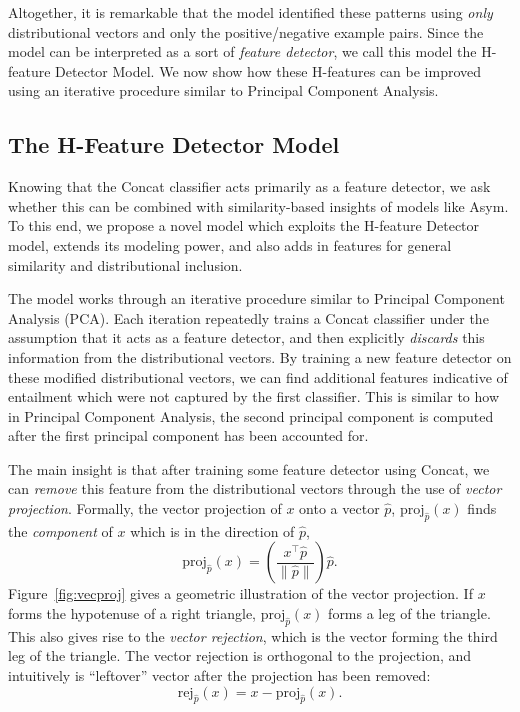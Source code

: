 Altogether, it is remarkable that the model identified these patterns using
{\em only} distributional vectors and only the positive/negative example pairs.
Since the model can be interpreted as a sort of {\em feature detector}, we
call this model the H-feature Detector Model.
We now show how these H-features
can be improved using an iterative procedure similar to Principal Component
Analysis.

\subsection{The H-Feature Detector Model}

Knowing that the Concat classifier acts primarily as a feature detector, we ask
whether this can be combined with similarity-based insights of models like
Asym. To this end, we propose a novel model which exploits the H-feature
Detector model, extends its modeling power, and also adds in features for
general similarity and distributional inclusion.

The model works through an iterative procedure similar to Principal Component
Analysis (PCA). Each iteration repeatedly trains a Concat classifier under the
assumption that it acts as a feature detector, and then explicitly {\em discards}
this information from the distributional vectors. By training a new feature
detector on these modified distributional vectors, we can find additional
features indicative of entailment which were not captured by the first
classifier. This is similar to how in Principal Component Analysis, the
second principal component is computed after the first principal component
has been accounted for.

The main insight is that after training some feature detector using Concat,
we can {\em remove} this feature from the distributional vectors through
the use of {\em vector projection}.
Formally, the vector projection of $x$ onto
a vector $\hat p$, $\text{proj}_{\hat p}(x)$ finds the {\em component} of $x$
which is in the direction of $\hat p$,
\begin{equation*}
  \text{proj}_{\hat p}(x) = \left(\frac{x^\top\hat p}{\|\hat p\|}\right)\hat p.
\end{equation*}
Figure~\ref{fig:vecproj} gives a geometric illustration of the vector
projection. If $x$ forms the hypotenuse of a right
triangle, $\text{proj}_{\hat p}(x)$ forms a leg of the triangle. This also
gives rise to the {\em vector rejection}, which is the vector forming the third
leg of the triangle. The vector rejection is orthogonal to the projection, and
intuitively is ``leftover'' vector after the projection has been removed:
\begin{equation*}
  \text{rej}_{\hat p}(x) = x - \text{proj}_{\hat p}(x).
\end{equation*}


